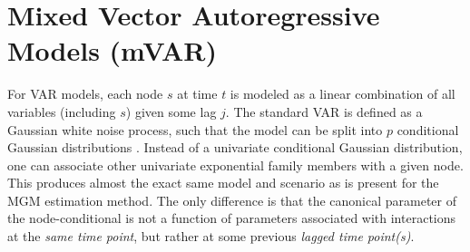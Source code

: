 \section{Mixed Vector Autoregressive Models (mVAR)}
For VAR models, each node $s$ at time $t$ is modeled as a linear combination of all variables (including $s$) given some lag $j$. The standard VAR is defined as a Gaussian white noise process, such that the model can be split into $p$ conditional Gaussian distributions \cite{hamilton1994time,pfaff2008time}. Instead of a univariate conditional Gaussian distribution, one can associate other univariate exponential family members with a given node. This produces almost the exact same model and scenario as is present for the MGM estimation method. The only difference is that the canonical parameter of the node-conditional is not a function of parameters associated with interactions at the \textit{same time point}, but rather at some previous \textit{lagged time point(s)}. 

